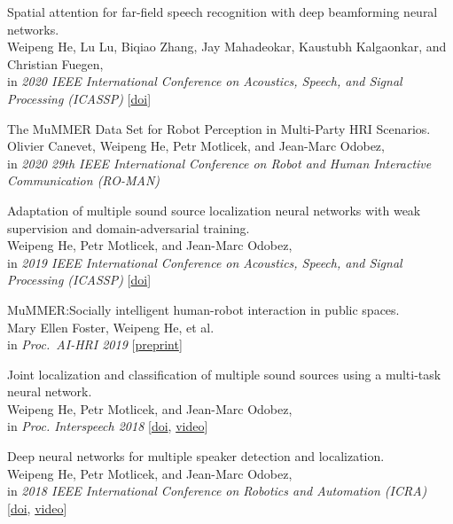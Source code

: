 \documentclass[a4paper,9pt]{extarticle} %
\begin{document}
\begin{enumerate}[label={[\arabic*]}]
  \item Spatial attention for far-field speech recognition with deep beamforming neural networks. \\
        Weipeng He, Lu Lu, Biqiao Zhang, Jay Mahadeokar, Kaustubh Kalgaonkar, and Christian Fuegen, \\
        in \textit{2020 IEEE International Conference on Acoustics, Speech, and Signal Processing (ICASSP)}
        [\href{https://doi.org/10.1109/ICASSP40776.2020.9053439}{doi}]

  \item The MuMMER Data Set for Robot Perception in Multi-Party HRI Scenarios. \\
        Olivier Canevet, Weipeng He, Petr Motlicek, and Jean-Marc Odobez, \\
        in \textit{2020 29th IEEE International Conference on Robot and Human Interactive Communication (RO-MAN)}

  \item Adaptation of multiple sound source localization neural networks with weak supervision and domain-adversarial training. \\
        Weipeng He, Petr Motlicek, and Jean-Marc Odobez, \\
        in \textit{2019 IEEE International Conference on Acoustics, Speech, and Signal Processing (ICASSP)}
        [\href{https://doi.org/10.1109/ICASSP.2019.8682655}{doi}]

  \item MuMMER:\@ Socially intelligent human-robot interaction in public spaces. \\
        Mary Ellen Foster, Weipeng He, et al. \\
        in \textit{Proc.\ AI-HRI 2019}
        [\href{https://arxiv.org/abs/1909.06749}{preprint}]

  \item Joint localization and classification of multiple sound sources using a multi-task neural network. \\
        Weipeng He, Petr Motlicek, and Jean-Marc Odobez, \\
        in \textit{Proc. Interspeech 2018}
        [\href{http://doi.org/10.21437/Interspeech.2018-1269}{doi}, \href{https://www.youtube.com/watch?v=O7bQvg03RTc}{video}]

  \item Deep neural networks for multiple speaker detection and localization. \\
        Weipeng He, Petr Motlicek, and Jean-Marc Odobez, \\
        in \textit{2018 IEEE International Conference on Robotics and Automation (ICRA)}
        [\href{http://doi.org/10.1109/ICRA.2018.8461267}{doi}, \href{https://www.youtube.com/watch?v=_4EwuVlE_pU}{video}]


\end{enumerate}
\end{document}
